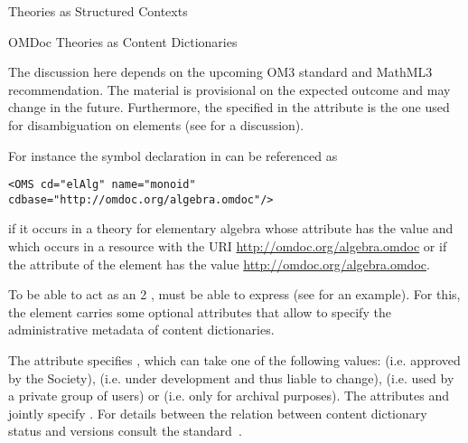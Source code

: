\begin{omgroup}[short=Mathematical Statements,id=statements]
\begin{omgroup}[id=theories-contexts]{Theories as Structured Contexts}
\begin{module}[id=theories]
\begin{omgroup}[id=identifying]{OMDoc Theories as Content Dictionaries}
\begin{oldpart}{The discussion here depends on the upcoming OM3 standard and MathML3
    recommendation. The material is provisional on the expected outcome and may change in
    the future.}
Furthermore, the {} specified in the {} attribute
is the one used for disambiguation on {} elements (see
{} for a discussion).
  
For instance the symbol declaration in {} can be referenced as
\begin{lstlisting}
<OMS cd="elAlg" name="monoid" cdbase="http://omdoc.org/algebra.omdoc"/>
\end{lstlisting}
if it occurs in a theory for elementary algebra whose
{} attribute has the value {} and which
occurs in a resource with the URI \url{http://omdoc.org/algebra.omdoc} or if the
{} attribute of the {} element has the value
\url{http://omdoc.org/algebra.omdoc}.

To be able to act as an {\openmath}2 {}, {\omdoc} must
be able to express {} (see {} for an
example). For this, the {} element carries some optional attributes that
allow to specify the administrative metadata of {\openmath} content dictionaries.

The {} attribute specifies , which can take one of the following values:
{} (i.e. approved by the {\openmath} Society),
{} (i.e. under development and thus liable to
change), {} (i.e. used by a private group of {\openmath}
users) or {} (i.e. only for archival purposes). The
attributes {} and {} jointly
specify . For details between the relation between content dictionary
status and versions consult the {\openmath} standard~\cite{BusCapCar:2oms04}.


\end{oldpart}
\end{omgroup}
\end{module}
\end{omgroup}
\end{omgroup}
